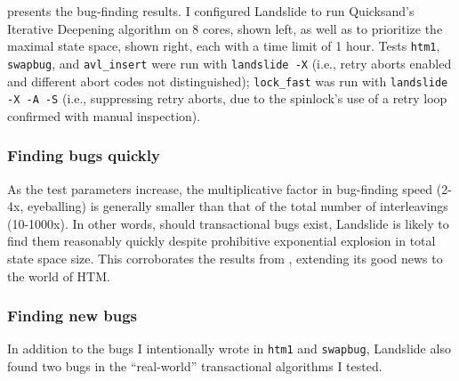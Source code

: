 presents the bug-finding results.
I configured Landslide to run Quicksand's Iterative Deepening algorithm on 8 cores, %
shown left,
as well as to prioritize the maximal state space, %
shown right,
each with a time limit of 1 hour.
Tests {\tt htm1}, {\tt swapbug}, and {\tt avl\_insert} were run with {\tt landslide -X}
(i.e., retry aborts enabled and different abort codes not distinguished);
{\tt lock\_fast} was run with {\tt landslide -X -A -S}
(i.e., suppressing retry aborts, due to the spinlock's use of a retry loop confirmed with manual inspection).

\subsubsection{Finding bugs quickly}

As the test parameters increase,
the multiplicative factor in bug-finding speed (2-4x, eyeballing) is generally smaller
than that of the total number of interleavings (10-1000x).
In other words,
should transactional bugs exist,
Landslide is likely to find them reasonably quickly %
despite prohibitive exponential explosion in total state space size.
This corroborates the results from ,
extending its good news to the world of HTM.

\subsubsection{Finding new bugs}

In addition to the bugs I intentionally wrote in {\tt htm1} and {\tt swapbug},
Landslide also found two bugs in the ``real-world'' transactional algorithms I tested.

